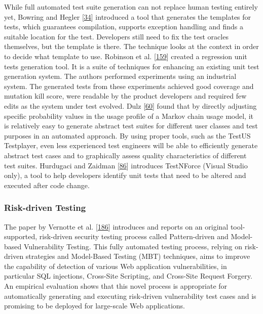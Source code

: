 \documentclass[]{book}
\begin{document}
While full automated test suite generation can not replace human testing
entirely yet, Bowring and Hegler
{[}\protect\hyperlink{ref-bowring2014obsidian}{34}{]} introduced a tool
that generates the templates for tests, which guarantees compilation,
supports exception handling and finds a suitable location for the test.
Developers still need to fix the test oracles themselves, but the
template is there. The technique looks at the context in order to decide
what template to use. Robinson et al.
{[}\protect\hyperlink{ref-robinson2011}{159}{]} created a regression
unit tests generation tool. It is a suite of techniques for enhancing an
existing unit test generation system. The authors performed experiments
using an industrial system. The generated tests from these experiments
achieved good coverage and mutation kill score, were readable by the
product developers and required few edits as the system under test
evolved. Dulz {[}\protect\hyperlink{ref-dulz2013model}{60}{]} found that
by directly adjusting specific probability values in the usage profile
of a Markov chain usage model, it is relatively easy to generate
abstract test suites for different user classes and test purposes in an
automated approach. By using proper tools, such as the TestUS
Testplayer, even less experienced test engineers will be able to
efficiently generate abstract test cases and to graphically assess
quality characteristics of different test suites. Hurdugaci and Zaidman
{[}\protect\hyperlink{ref-hurdugaci2012}{86}{]} introduces TestNForce
(Visual Studio only), a tool to help developers identify unit tests that
need to be altered and executed after code change.

\subsubsection{Risk-driven Testing}\label{risk-driven-testing}

The paper by Vernotte et al.
{[}\protect\hyperlink{ref-vernotte2015}{186}{]} introduces and reports
on an original tool-supported, risk-driven security testing process
called Pattern-driven and Model-based Vulnerability Testing. This fully
automated testing process, relying on risk-driven strategies and
Model-Based Testing (MBT) techniques, aims to improve the capability of
detection of various Web application vulnerabilities, in particular SQL
injections, Cross-Site Scripting, and Cross-Site Request Forgery. An
empirical evaluation shows that this novel process is appropriate for
automatically generating and executing risk-driven vulnerability test
cases and is promising to be deployed for large-scale Web applications.
\end{document}
